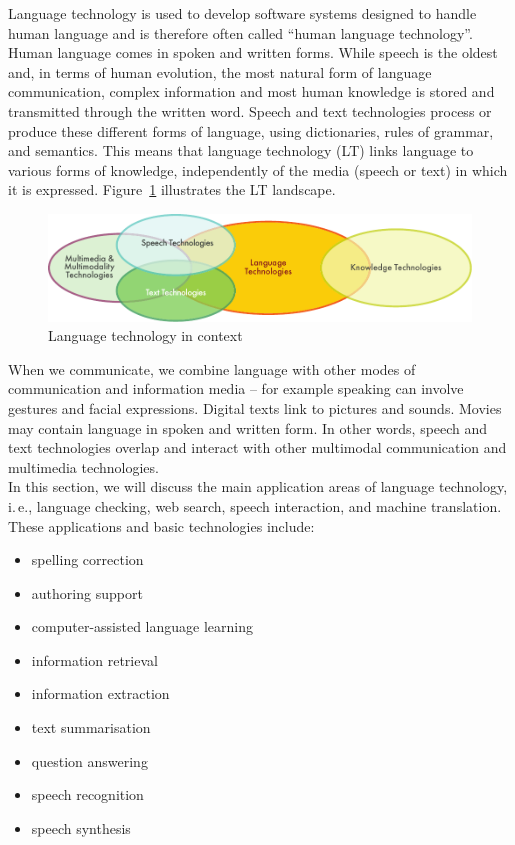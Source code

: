 \begin{multicols}{2}

Language technology is used to develop software systems designed to handle human language and is therefore often called “human language technology”. Human language comes in spoken and written forms. While speech is the oldest and, in terms of human evolution, the most natural form of language communication, complex information and most human knowledge is stored and transmitted through the written word. Speech and text technologies process or produce these different forms of language, using dictionaries, rules of grammar, and semantics. This means that language technology (LT) links language to various forms of knowledge, independently of the media (speech or text) in which it is expressed. Figure~\ref{fig:ltincontext_en} illustrates the LT landscape.

\begin{figure}[htb]
  \center
  \includegraphics[width=\textwidth]{../_media/english/language_technologies}
  \caption{Language technology in context}
  \label{fig:ltincontext_en}
\end{figure}

When we communicate, we combine language with other modes of communication and information media – for example speaking can involve gestures and facial expressions. Digital texts link to pictures and sounds. Movies may contain language in spoken and written form. In other words, speech and text technologies overlap and interact with other multimodal communication and multimedia technologies.\\ 
In this section, we will discuss the main application areas of language technology, i.\,e., language checking, web search, speech interaction, and machine translation. These applications and basic technologies include:

\begin{itemize}
\item spelling correction
\item authoring support
\item computer-assisted language learning
\item information retrieval 
\item information extraction
\item text summarisation
\item question answering
\item speech recognition 
\item speech synthesis 
\end{itemize}


\end{multicols}
